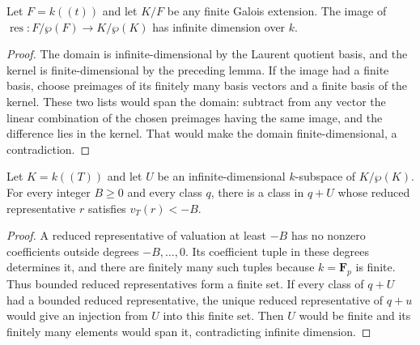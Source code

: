 \begin{lemma}
\label{lem:artin-schreier-restriction-infinite-image}
\leanok
Let $F=k((t))$ and let $K/F$ be any finite Galois extension.
The image of
$\operatorname{res}:F/\wp(F)\to K/\wp(K)$ has infinite
dimension over $k$.
\end{lemma}

\begin{proof}
The domain is infinite-dimensional by the Laurent quotient
basis, and the kernel is finite-dimensional by the preceding
lemma. If the image had a finite basis, choose preimages of
its finitely many basis vectors and a finite basis of the
kernel. These two lists would span the domain: subtract from
any vector the linear combination of the chosen preimages
having the same image, and the difference lies in the kernel.
That would make the domain finite-dimensional, a contradiction.
\end{proof}

\begin{lemma}
\label{lem:artin-schreier-unbounded-reduced-poles}
\leanok
Let $K=k((T))$ and let $U$ be an infinite-dimensional
$k$-subspace of $K/\wp(K)$.
For every integer $B\ge0$ and every class $q$, there is a class
in $q+U$ whose reduced representative $r$ satisfies $v_T(r)<-B$.
\end{lemma}

\begin{proof}
A reduced representative of valuation at least $-B$ has no
nonzero coefficients outside degrees $-B,\ldots,0$.
Its coefficient tuple in these degrees determines it, and
there are finitely many such tuples because $k=\mathbf F_p$
is finite. Thus bounded reduced representatives form a finite set.
If every class of $q+U$ had a bounded reduced representative,
the unique reduced representative of $q+u$ would give an injection
from $U$ into this finite set. Then $U$ would be finite and its
finitely many elements would span it, contradicting infinite dimension.
\end{proof}

